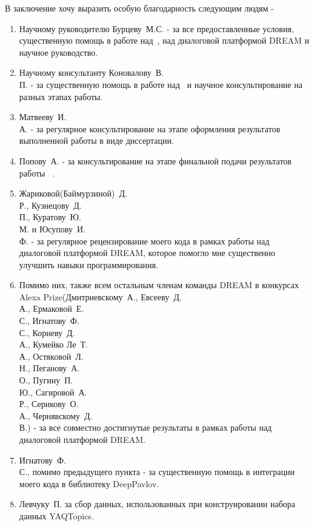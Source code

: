 В заключение хочу выразить особую благодарность следующим людям - 
\begin{enumerate}
\item Научному руководителю Бурцеву~М.\:С. - за все предоставленные условия, существенную помощь в работе над~\cite{dream1,dream1_trudy,dream2,pseudolabel}, над диалоговой платформой DREAM и научное руководство.
\item Научному консультанту Коновалову~В.\\П. - за существенную помощь в работе над~\cite{rumtl,rutopics,enmtl,dp_2023} и научное консультирование на разных этапах работы.
\item Матвееву~И.\\А. - за регулярное консультирование на этапе оформления результатов выполненной работы в виде диссертации.
\item Попову~А. - за консультирование на этапе финальной подачи результатов работы ~\cite{rutopics}.
\item Жариковой(Баймурзиной)~Д.\\Р., Кузнецову~Д.\\П., Куратову~Ю.\\М. и Юсупову~И.\\Ф. - за регулярное рецензирование моего кода в рамках работы над диалоговой платформой DREAM, которое помогло мне существенно улучшить навыки программирования. 
\item Помимо них, также всем остальным членам команды DREAM в конкурсах Alexa Prize(Дмитриевскому~А., Евсееву~Д.\\А., Ермаковой~Е.\\С., Игнатову~Ф.\\С., Корневу~Д.\\А., Кумейко Ле~Т.\\А., Остяковой~Л.\\Н., Пеганову~А.\\О., Пугину~П.\\Ю., Сагировой~А.\\Р., Серикову~О.\\А., Чернявскому~Д.\\В.) - за все совместно достигнутые результаты в рамках работы над диалоговой платформой DREAM. 
\item Игнатову~Ф.\\С., помимо предыдущего пункта - за существенную помощь в интеграции моего кода в библиотеку DeepPavlov.
\item Левчуку~П. за сбор данных, использованных при конструировании набора данных YAQTopics.

\end{enumerate}
